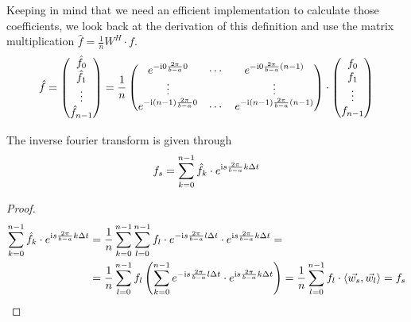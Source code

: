 Keeping in mind that we need an efficient implementation to calculate those coefficients, we look back at the derivation of this definition and use the matrix multiplication \(\hat{f} = \frac{1}{n} W^H \cdot f\).
\[\hat{f} = \begin{pmatrix}\hat{f}_0\\\hat{f}_1\\\vdots\\\hat{f}_{n-1}\end{pmatrix} = \frac{1}{n} \begin{pmatrix}
   e^{-\mathrm{i} 0 \frac{2\pi}{b-a} 0} & \cdots & e^{-\mathrm{i} 0 \frac{2\pi}{b-a} (n-1)}\\
   \vdots & & \vdots \\
   e^{-\mathrm{i} (n-1) \frac{2\pi}{b-a} 0} & \cdots & e^{-\mathrm{i} (n-1) \frac{2\pi}{b-a} (n-1)}\\
\end{pmatrix} \cdot \begin{pmatrix}f_0\\ f_1\\ \vdots \\ f_{n-1}\end{pmatrix}\]


\begin{lemma}
   The inverse fourier transform is given through
   \[f_s = \sum_{k=0}^{n-1} \hat{f}_k \cdot e^{\mathrm{i} s \frac{2\pi}{b-a} k \Delta t}\]
\end{lemma}
\begin{proof}
   \begin{equation*}
      \begin{split}
         \sum_{k=0}^{n-1} \hat{f}_k \cdot e^{\mathrm{i} s \frac{2\pi}{b-a} k \Delta t} & = \frac{1}{n} \sum_{k=0}^{n-1}\sum_{l=0}^{n-1} f_l \cdot e^{-\mathrm{i} s \frac{2\pi}{b-a} l \Delta t} \cdot e^{\mathrm{i} s \frac{2\pi}{b-a} k \Delta t} = \\
                                                                                  & = \frac{1}{n}\sum_{l=0}^{n-1}f_l \left(\sum_{k=0}^{n-1} e^{-\mathrm{i} s \frac{2\pi}{b-a} l \Delta t} \cdot e^{\mathrm{i} s \frac{2\pi}{b-a} k \Delta t}\right) = \frac{1}{n}\sum_{l=0}^{n-1} f_l \cdot \langle \vec{w_s}, \vec{w_l}\rangle = f_s
      \end{split}
   \end{equation*}
\end{proof}

